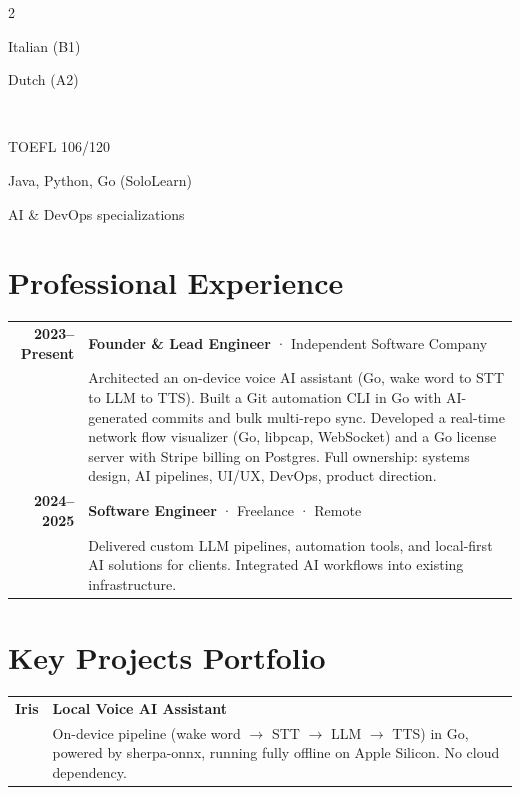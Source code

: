 \documentclass[lighthipster]{simplehipstercv}
\begin{document}
\begin{paracol}{2}
{Italian (B1)

Dutch (A2)

\bigskip

\\[0.5em]

{\footnotesize TOEFL 106/120

Java, Python, Go (SoloLearn)

AI \& DevOps specializations}

\vfill

}
\switchcolumn

\small
\section*{Professional Experience}

\begin{tabular}{r| p{}}
    \textbf{2023--Present} & \textbf{Founder \& Lead Engineer} · \textcolor{cvgreen}{Independent Software Company} \\
    & {\footnotesize Architected an on-device voice AI assistant (Go, wake word to STT to LLM to TTS). Built a Git automation CLI in Go with AI-generated commits and bulk multi-repo sync. Developed a real-time network flow visualizer (Go, libpcap, WebSocket) and a Go license server with Stripe billing on Postgres. Full ownership: systems design, AI pipelines, UI/UX, DevOps, product direction.} \\[0.8em]

    \textbf{2024--2025} & \textbf{Software Engineer} · \textcolor{cvgreen}{Freelance} · Remote \\
    & {\footnotesize Delivered custom LLM pipelines, automation tools, and local-first AI solutions for clients. Integrated AI workflows into existing infrastructure.} \\
\end{tabular}

\vspace{1.2em}

\section*{Key Projects Portfolio}

\begin{tabular}{r| p{}}
    \textbf{Iris} & \textbf{Local Voice AI Assistant} \\
    & {\footnotesize On-device pipeline (wake word $\to$ STT $\to$ LLM $\to$ TTS) in Go, powered by sherpa-onnx, running fully offline on Apple Silicon. No cloud dependency.} \\[0.8em]


\end{tabular}
\end{paracol}
\end{document}
